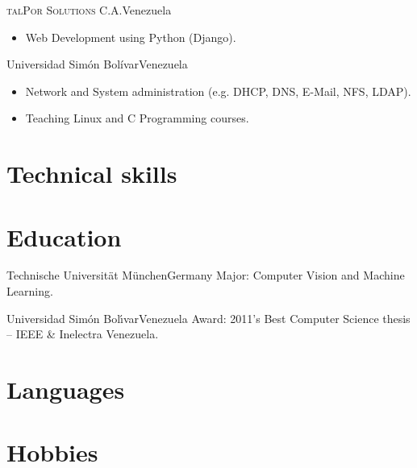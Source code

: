 \documentclass[10pt]{moderncv}
\begin{document}
{\textsc{talPor Solutions C.A.}}{Venezuela}{}{%
\begin{itemize}
  \item Web Development using Python (Django).
\end{itemize}
}

 {Universidad Sim\'{o}n Bol\'{i}var}{Venezuela}{}{%
\begin{itemize}
  \item Network and System administration (e.g. DHCP, DNS, E-Mail, NFS, LDAP).
  \item Teaching Linux and C Programming courses.
\end{itemize}
}

\section{Technical skills}



\section{Education}

  {Technische Universit\"at M\"unchen}{Germany}{}{%
    Major: Computer Vision and Machine Learning.
  }

  {Universidad Sim\'on Bol\'{\i}var}{Venezuela}{}{%
    Award: 2011's Best Computer Science thesis -- IEEE \& Inelectra Venezuela.
  }


\section{Languages}


\section{Hobbies}
\end{document}
